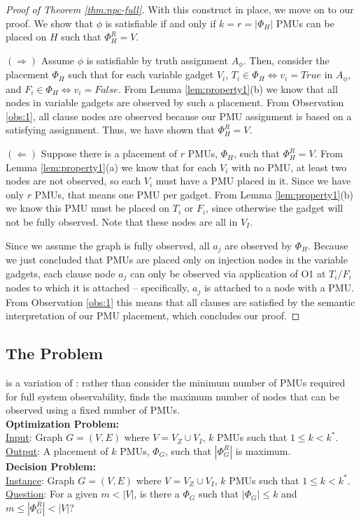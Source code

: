 \begin{proof}[Proof of Theorem \ref{thm:npc-full}]
With this construct in place, we move on to our proof. We show that $\phi$ is satisfiable if and only if $k=r=|\Phi_H|$ PMUs
can be placed on $H$ such that $\Phi^R_{H}=V$.

$(\Rightarrow)$ Assume $\phi$ is satisfiable by truth assignment $A_{\phi}$. Then, consider the placement $\Phi_H$ such that for each variable gadget $V_i$, $T_i\in \Phi_H \Leftrightarrow v_i=True$
in $A_\phi$, and  $F_i\in \Phi_H \Leftrightarrow v_i=False$. From Lemma \ref{lem:property1}(b) we know that all nodes in variable gadgets are observed by such a placement. From Observation \ref{obs:1}, all clause nodes are observed because our PMU assignment is based on a satisfying assignment.
Thus, we have shown that $\Phi^R_{H}=V$.

$(\Leftarrow)$
Suppose there is a placement of $r$ PMUs, $\Phi_H$, such that $\Phi_H^R = V$.  From Lemma \ref{lem:property1}(a) we know that for each $V_i$ with no PMU, at least two nodes are not observed, so each $V_i$  must have a PMU placed in it. 
Since we have only $r$ PMUs, that means one PMU per gadget. From Lemma \ref{lem:property1}(b) we know this PMU must be placed on $T_i$ or $F_i$, since otherwise the gadget will not be fully observed. Note that these nodes are all in $V_I$.

Since we assume the graph is fully observed, all $a_j$ are observed by $\Phi_H$. Because we just concluded that PMUs are placed only on injection nodes in the variable gadgets, each clause node $a_j$ can only be observed via application of O1 at $T_i/F_i$ nodes to which it is attached -- specifically, $a_j$ is attached to a node with a PMU. From Observation \ref{obs:1} this means that all clauses are satisfied by the semantic interpretation of our PMU placement, which concludes our proof. 
\end{proof}

\subsection{The \maxinc Problem}
\label{subsec:maxinc}

\maxinc is a variation of \fulls: rather than consider the minimum number of PMUs required for full system observability,
\maxinc finds the maximum number of nodes that can be observed using a fixed number of PMUs.
\\
{\bf \maxinc Optimization Problem:} \\
	\indent \underline{Input}: Graph $G=(V,E)$ where $V=V_Z \cup V_I$, $k$ PMUs such that $1 \leq k < k^*$. \\
	\indent \underline{Output}: A placement of $k$ PMUs, $\Phi_G$, such that $|\Phi^R_G|$ is maximum. 
\\
{\bf \maxinc Decision Problem:} \\
	\indent \underline{Instance}: Graph $G=(V,E)$ where $V=V_Z \cup V_I$, $k$ PMUs such that $1 \leq k < k^*$.	 \\
	\indent \underline{Question}: For a given $m< |V|$, is there a $\Phi_G$ such that $|\Phi_G| \leq k$ and $m \leq |\Phi^R_G| < |V|$?


